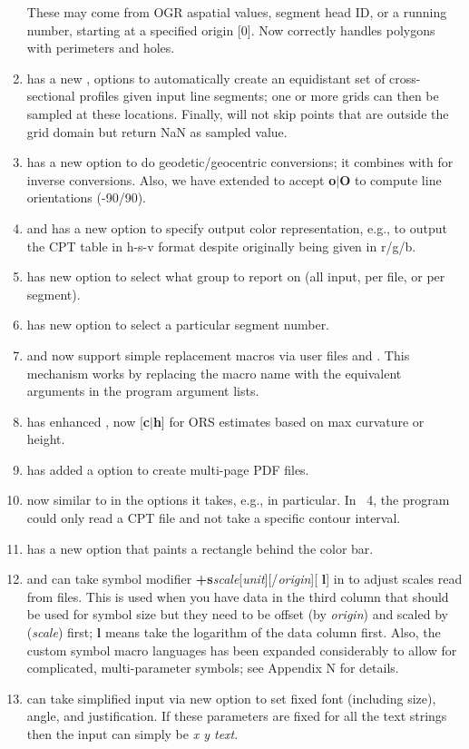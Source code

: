 \begin{enumerate}
		These may come from OGR aspatial values, segment head ID,
		or a running number, starting at a specified origin [0].
		Now correctly handles polygons with perimeters and holes.
	\item {} has a new ,  options to automatically create an equidistant set of cross-sectional
		profiles given input line segments; one or more grids can then be sampled at these locations.  Finally, 
		will not skip points that are outside the grid domain but return NaN as sampled value.
	\item {} has a new  option to do geodetic/geocentric conversions; it combines with 
		for inverse conversions.  Also, we have extended  to accept \textbf{o}$|$\textbf{O} to compute line orientations (-90/90).
	\item {} and  has a new  option to specify output color representation, e.g.,
		to output the CPT table in h-s-v format despite originally being given in r/g/b.
	\item {} has new option  to select what group to report on (all input, per file, or per segment).
	\item {} has new option  to select a particular segment number.
	\item {} and  now support simple replacement macros via user files
		 and .  This mechanism works by replacing the macro name
		with the equivalent arguments in the program argument lists.
	\item {} has enhanced , now [\textbf{c}$|$\textbf{h}] for ORS estimates based on max curvature or height.
	\item {} has added a  option to create multi-page PDF files.
	\item {} now similar to  in the options it takes, e.g.,  in particular.
		In \GMT\ 4, the program could only read a CPT file and not take a specific contour interval.
	\item {} has a new option  that paints a rectangle behind the color bar.
	\item {} and  can take symbol modifier \textbf{+s}\emph{scale}[\emph{unit}][/\emph{origin}][{ \bf l}]
		in  to adjust scales read from files.  This is used when you have data in the third column that should be
		used for symbol size but they need to be offset (by \emph{origin}) and scaled by (\emph{scale}) first; \textbf{l} means
		take the logarithm of the data column first.  Also, the custom symbol macro languages has been expanded considerably
		to allow for complicated, multi-parameter symbols; see Appendix N for details.
	\item {} can take simplified input via new option  to set fixed font (including size), angle, and justification.  If
		these parameters are fixed for all the text strings then the input can simply be \emph{x y text}.
	

\end{enumerate}
